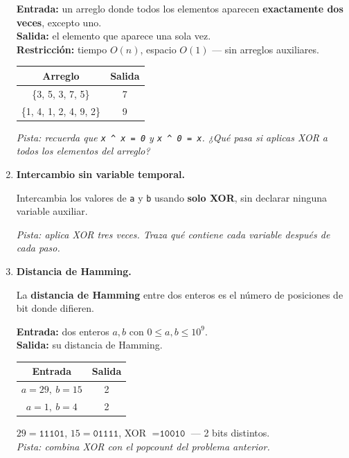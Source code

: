 \documentclass[12pt, oneside]{article}
\begin{document}
\begin{enumerate}[resume]
        \textbf{Entrada:} un arreglo donde todos los elementos aparecen
        \textbf{exactamente dos veces}, excepto uno. \\
        \textbf{Salida:} el elemento que aparece una sola vez. \\
        \textbf{Restricción:} tiempo $O(n)$, espacio $O(1)$ — sin arreglos auxiliares.

        \begin{center}
        \begin{tabular}{cc}
          \textbf{Arreglo} & \textbf{Salida} \\ \hline
          \{3, 5, 3, 7, 5\} & 7 \\
          \{1, 4, 1, 2, 4, 9, 2\} & 9
        \end{tabular}
        \end{center}

        \textit{Pista: recuerda que
        \texttt{x \textasciicircum{} x = 0} y
        \texttt{x \textasciicircum{} 0 = x}.
        ¿Qué pasa si aplicas XOR a todos los elementos del arreglo?}

  \item \textbf{Intercambio sin variable temporal.}

        Intercambia los valores de \texttt{a} y \texttt{b} usando
        \textbf{solo XOR}, sin declarar ninguna variable auxiliar.

        \textit{Pista: aplica XOR tres veces. Traza qué contiene cada variable
        después de cada paso.}

  \item \textbf{Distancia de Hamming.}

        La \textbf{distancia de Hamming} entre dos enteros es el número de
        posiciones de bit donde difieren.

        \textbf{Entrada:} dos enteros $a, b$ con $0 \leq a, b \leq 10^9$. \\
        \textbf{Salida:} su distancia de Hamming.

        \begin{center}
        \begin{tabular}{cc}
          \textbf{Entrada} & \textbf{Salida} \\ \hline
          $a=29,\ b=15$ & 2 \\
          $a=1,\ b=4$   & 2
        \end{tabular}
        \end{center}

        $29 = \texttt{11101}$, $15 = \texttt{01111}$,
        XOR $= \texttt{10010}$ — 2 bits distintos. \\[4pt]
        \textit{Pista: combina XOR con el popcount del problema anterior.}


\end{enumerate}
\end{document}
